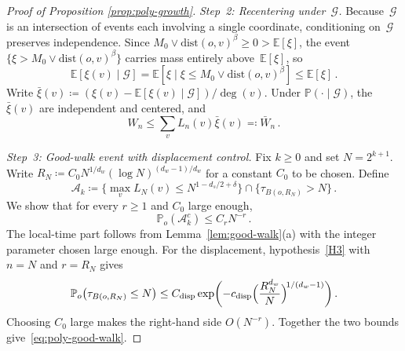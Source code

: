 \documentclass[aop]{imsart}
\theoremstyle{plain}
\theoremstyle{definition}
\newcommand{\E}{\mathbb{E}}
\renewcommand{\P}{\mathbb{P}}
\begin{document}
\begin{proof}[Proof of Proposition \ref{prop:poly-growth}]
		\emph{Step~2: Recentering under~$\mathcal{G}$.}
		Because~$\mathcal{G}$ is an intersection of events each involving a single coordinate, conditioning on~$\mathcal{G}$ preserves independence.  Since $M_0\vee \mathrm{dist}(o,v)^\beta\geq 0>\E[\xi]$, the event $\{\xi>M_0\vee \mathrm{dist}(o,v)^\beta\}$ carries mass entirely above~$\E[\xi]$, so
		\[
		\E[\xi(v)\mid\mathcal{G}] = \E[\xi\mid\xi\leq M_0\vee \mathrm{dist}(o,v)^\beta] \leq \E[\xi]\,.
		\]
		Write $\bar\xi(v)\coloneqq(\xi(v)-\E[\xi(v)\mid\mathcal{G}])/\deg(v)$.  Under $\P(\cdot\mid\mathcal{G})$, the $\bar\xi(v)$ are independent and centered, and
		\begin{equation}\label{eq:poly-Wbar}
			W_n \leq \sum_v L_n(v)\bar\xi(v) \eqqcolon \bar W_n\,.
		\end{equation}
		
		\emph{Step~3: Good-walk event with displacement control.}
		Fix $k\geq 0$ and set $N=2^{k+1}$. Write $R_N\coloneqq C_0 N^{1/d_w}(\log N)^{(d_w-1)/d_w}$ for a constant $C_0$ to be chosen. Define
		\[
		\mathcal{A}_k \coloneqq \bigl\{\max_v L_N(v)\leq N^{1-d_s/2+\delta}\bigr\}
		\cap \bigl\{\tau_{B(o,R_N)}> N\bigr\}\,.
		\]
		We show that for every $r\geq 1$ and $C_0$ large enough,
		\begin{equation}\label{eq:poly-good-walk}
			\P_o(\mathcal{A}_k^c) \leq C_r N^{-r}\,.
		\end{equation}
		The local-time part follows from Lemma~\ref{lem:good-walk}(a) with the integer parameter chosen large enough. For the displacement, hypothesis~\ref{H3} with $n=N$ and $r=R_N$ gives
		\[
		\P_o\bigl(\tau_{B(o,R_N)}\leq N\bigr)\leq C_{\mathrm{disp}}\exp\biggl(-c_{\mathrm{disp}}\Bigl(\frac{R_N^{d_w}}{N}\Bigr)^{\!1/(d_w-1)}\biggr)\,.
		\]
		Choosing $C_0$ large makes the right-hand side $O(N^{-r})$.  Together the two bounds give~\eqref{eq:poly-good-walk}.
		

\end{proof}
\end{document}
